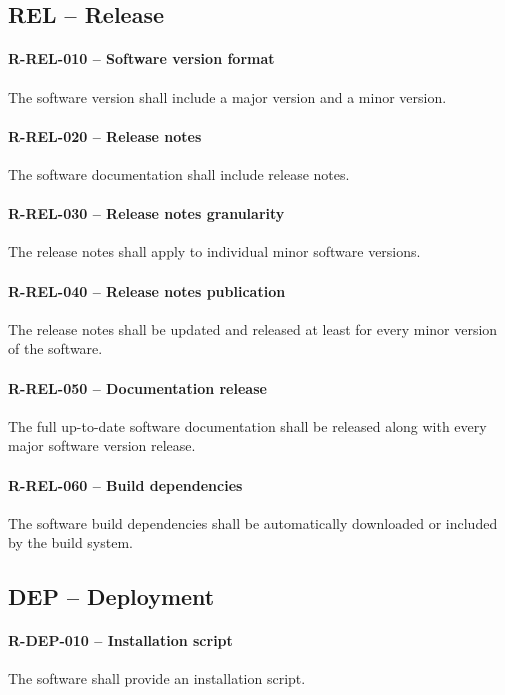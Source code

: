 \subsection{REL -- Release}
\paragraph{R-REL-010 -- Software version format}
The software version shall include a major version and a minor version.

\paragraph{R-REL-020 -- Release notes}
The software documentation shall include release notes.

\paragraph{R-REL-030 -- Release notes granularity}
The release notes shall apply to individual minor software versions.

\paragraph{R-REL-040 -- Release notes publication}
The release notes shall be updated and released at least for every minor
version of the software.

\paragraph{R-REL-050 -- Documentation release}
The full up-to-date software documentation shall be released along with
every major software version release.

\paragraph{R-REL-060 -- Build dependencies}
The software build dependencies shall be automatically downloaded or included by
the build system.

\subsection{DEP -- Deployment}
\paragraph{R-DEP-010 -- Installation script}
The software shall provide an installation script.

